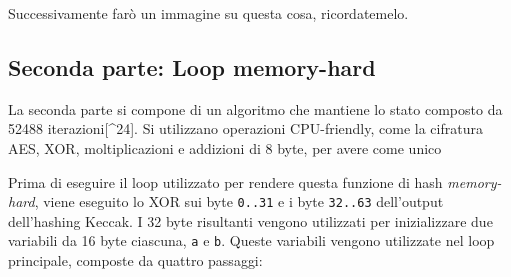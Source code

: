 \documentclass[
]{article}
\begin{document}
Successivamente farò un immagine su questa cosa, ricordatemelo.

\subsection{Seconda parte: Loop
memory-hard}\label{seconda-parte-loop-memory-hard}

La seconda parte si compone di un algoritmo che mantiene lo stato
composto da 52488 iterazioni{[}\^{}24{]}. Si utilizzano operazioni
CPU-friendly, come la cifratura AES, XOR, moltiplicazioni e addizioni di
8 byte, per avere come unico

Prima di eseguire il loop utilizzato per rendere questa funzione di hash
\emph{memory-hard}, viene eseguito lo XOR sui byte \texttt{0..31} e i
byte \texttt{32..63} dell'output dell'hashing Keccak. I 32 byte
risultanti vengono utilizzati per inizializzare due variabili da 16 byte
ciascuna, \texttt{a} e \texttt{b}. Queste variabili vengono utilizzate
nel loop principale, composte da quattro passaggi:
\end{document}
